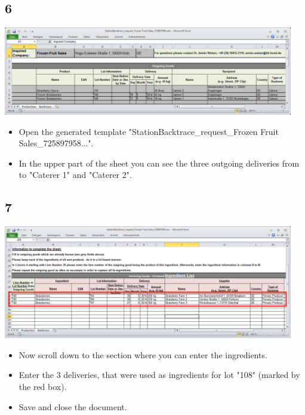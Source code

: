 \documentclass{beamer}
\begin{document}
\subsection{6}
\begin{frame}
	\begin{center}
  		\includegraphics[width=0.95\textwidth]{6.png}
	\end{center}
	\begin{itemize}
		\item Open the generated template "StationBacktrace\_request\_Frozen Fruit Sales\_725897958...".
		\item In the upper part of the sheet you can see the three outgoing deliveries from to "Caterer 1" and "Caterer 2".
	\end{itemize}
\end{frame}

\subsection{7}
\begin{frame}
	\begin{center}
  		\includegraphics[width=0.95\textwidth]{7.png}
	\end{center}
	\begin{itemize}
		\item Now scroll down to the section where you can enter the ingredients.
		\item Enter the 3 deliveries, that were used as ingredients for lot "108" (marked by the red box).
		\item Save and close the document.
	\end{itemize}
\end{frame}
\end{document}

